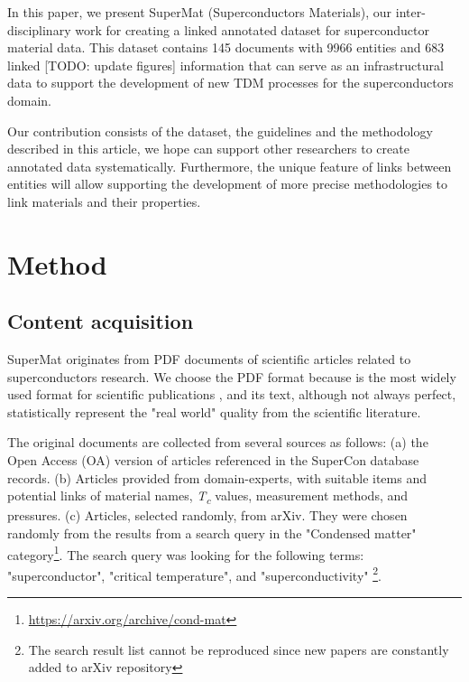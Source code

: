 \documentclass[fleqn,10pt]{wlscirep}
\begin{document}
In this paper, we present SuperMat (Superconductors Materials), our inter-disciplinary work for creating a linked annotated dataset for superconductor material data. 
This dataset contains 145 documents with 9966 entities and 683 linked [TODO: update figures] information that can serve as an infrastructural data to support the development of new TDM processes for the superconductors domain. 

Our contribution consists of the dataset, the guidelines and the methodology described in this article, we hope can support other researchers to create annotated data systematically.
Furthermore, the unique feature of links between entities will allow supporting the development of more precise methodologies to link materials and their properties.

\label{sec:method}
\section*{Method}

\label{content-acquisition}
\subsection*{Content acquisition}
SuperMat originates from PDF documents of scientific articles related to superconductors research. 
We choose the PDF format because is the most widely used format for scientific publications \cite{johnson2018pdfStatistics}, and its text, although not always perfect, statistically represent the "real world" quality from the scientific literature.

The original documents are collected from several sources as follows: (a) the Open Access (OA) version of articles referenced in the SuperCon database records. 
(b) Articles provided from domain-experts, with suitable items and potential links of material names, \textit{T\textsubscript{c}} values, measurement methods, and pressures.  
(c) Articles, selected randomly, from arXiv. They were chosen randomly from the results from a search query in the "Condensed matter" category\footnote{\url{https://arxiv.org/archive/cond-mat}}. The search query was looking for the following terms: "superconductor", "critical temperature", and "superconductivity" \footnote{The search result list cannot be reproduced since new papers are constantly added to arXiv repository}.
\end{document}
